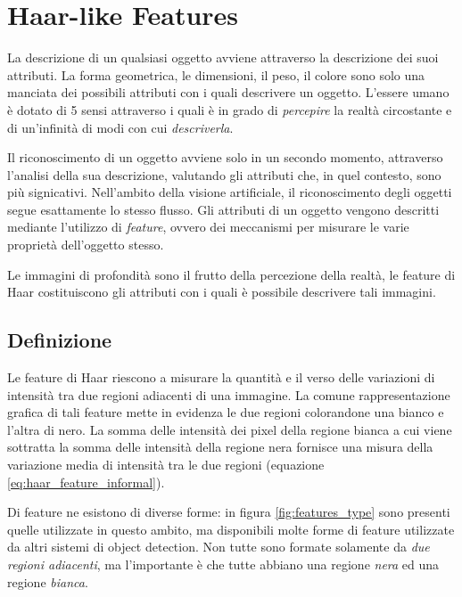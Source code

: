 
\chapter{Haar-like Features}
\label{cap:haar_features}
La descrizione di un qualsiasi oggetto avviene attraverso la descrizione dei suoi attributi. La forma geometrica, le dimensioni, il peso, il colore sono solo una manciata dei possibili attributi con i quali descrivere un oggetto.
L'essere umano è dotato di 5 sensi attraverso i quali è in grado di \emph{percepire} la realtà circostante e di un'infinità di modi con cui \emph{descriverla}.

Il riconoscimento di un oggetto avviene solo in un secondo momento, attraverso l'analisi della sua descrizione, valutando gli attributi che, in quel contesto, sono più signicativi.
Nell'ambito della visione artificiale, il riconoscimento degli oggetti segue esattamente lo stesso flusso.
Gli attributi di un oggetto vengono descritti mediante l'utilizzo di \emph{feature}, ovvero dei meccanismi per misurare le varie proprietà dell'oggetto stesso.

Le immagini di profondità sono il frutto della percezione della realtà, le feature di Haar costituiscono gli attributi con i quali è possibile descrivere tali immagini.


\section{Definizione}
\label{sec:haar_def}
Le feature di Haar riescono a misurare la quantità e il verso delle variazioni di intensità tra due regioni adiacenti di una immagine.
La comune rappresentazione grafica di tali feature mette in evidenza le due regioni colorandone una bianco e l'altra di nero.
La somma delle intensità dei pixel della regione bianca a cui viene sottratta la somma delle intensità della regione nera fornisce una misura della variazione media di intensità tra le due regioni (equazione \ref{eq:haar_feature_informal}).

Di feature ne esistono di diverse forme: in figura \ref{fig:features_type} sono presenti quelle utilizzate in questo ambito, ma disponibili molte forme di feature utilizzate da altri sistemi di object detection. Non tutte sono formate solamente da \emph{due regioni adiacenti}, ma l'importante è che tutte abbiano una regione \emph{nera} ed una regione \emph{bianca}.

